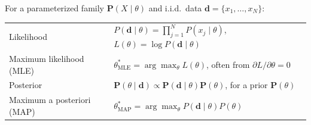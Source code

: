 \documentclass[11pt, a4paper]{exam}
\begin{document}
\begin{recap}
    For a parameterized family $\mathbf{P}(X \mid \theta)$ and i.i.d.\ data $\mathbf{d} = \{x_1, \ldots, x_N\}$:
    \begin{center}
        \begin{tabular}{ll}
            \toprule
            Likelihood & $P(\mathbf{d} \mid \theta) = \prod_{j=1}^N P(x_j \mid \theta)$, \quad $L(\theta) = \log P(\mathbf{d} \mid \theta)$ \\
            Maximum likelihood (MLE) & $\theta^*_{\text{MLE}} = \arg \max_\theta L(\theta)$, often from $\partial L / \partial \theta = 0$ \\
            Posterior & $\mathbf{P}(\theta \mid \mathbf{d}) \propto \mathbf{P}(\mathbf{d} \mid \theta) \mathbf{P}(\theta)$, for a prior $\mathbf{P}(\theta)$ \\
            Maximum a posteriori (MAP) & $\theta^*_{\text{MAP}} = \arg \max_\theta P(\mathbf{d} \mid \theta) P(\theta)$ \\
            \bottomrule
        \end{tabular}
    \end{center}
\end{recap}
\end{document}
